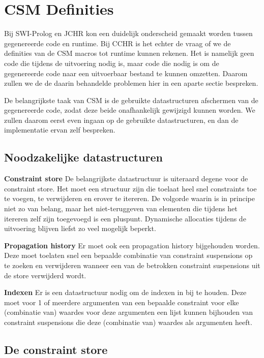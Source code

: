 \section{CSM Definities} \label{sec:impl-csm}

Bij SWI-Prolog en JCHR kon een duidelijk onderscheid gemaakt worden tussen gegenereerde code en runtime. Bij CCHR is het echter de vraag of we de definities van de CSM macros tot runtime kunnen rekenen. Het is namelijk geen code die tijdens de uitvoering nodig is, maar code die nodig is om de gegenereerde code naar een uitvoerbaar bestand te kunnen omzetten. Daarom zullen we de de daarin behandelde problemen hier in een aparte sectie bespreken.

De belangrijkste taak van CSM is de gebruikte datastructuren afschermen van de gegenereerde code, zodat deze beide onafhankelijk gewijzigd kunnen worden. We zullen daarom eerst even ingaan op de gebruikte datastructuren, en dan de implementatie ervan zelf bespreken.

\subsection{Noodzakelijke datastructuren} \label{ssec:impl-csm-ds}

{\bf Constraint store} De belangrijkste datastructuur is uiteraard degene voor de constraint store. Het moet een structuur zijn die toelaat heel snel constraints toe te voegen, te verwijderen en erover te itereren. De volgorde waarin is in principe niet zo van belang, maar het niet-teruggeven van elementen die tijdens het itereren zelf zijn toegevoegd is een pluspunt. Dynamische allocaties tijdens de uitvoering blijven liefst zo veel mogelijk beperkt.

{\bf Propagation history} Er moet ook een propagation history bijgehouden worden. Deze moet toelaten snel een bepaalde combinatie van constraint suspensions op te zoeken en verwijderen wanneer een van de betrokken constraint suspensions uit de store verwijderd wordt.

{\bf Indexen} Er is een datastructuur nodig om de indexen in bij te houden. Deze moet voor 1 of meerdere argumenten van een bepaalde constraint voor elke (combinatie van) waardes voor deze argumenten een lijst kunnen bijhouden van constraint suspensions die deze (combinatie van) waardes als argumenten heeft.
 
\subsection{De constraint store} \label{ssec:impl-csm-cs}

